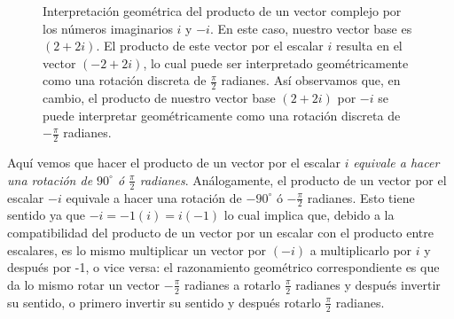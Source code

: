 \documentclass[apuntes]{subfiles}
\begin{document}
\begin{figure}[h!]
    \centering
    \caption{Interpretación geométrica del producto de un vector complejo por los números imaginarios $i$ y $-i$. En este caso, nuestro vector base es $(2+2i)$. El producto de este vector por el escalar $i$ resulta en el vector $(-2+2i)$, lo cual puede ser interpretado geométricamente como una rotación discreta de $\frac{\pi}{2}$ radianes. Así observamos que, en cambio, el producto de nuestro vector base $(2+2i)$ por $-i$ se puede interpretar geométricamente como una rotación discreta de $-\frac{\pi}{2}$ radianes.}
    \label{fig:Producto_de_un_vector_complejo_por_i}
\end{figure}

   Aquí vemos que hacer el producto de un vector por el escalar $i$ \emph{equivale a hacer una rotación de $90^\circ$ ó $\frac{\pi}{2}$ radianes}. Análogamente, el producto de un vector por el escalar $-i$ equivale a hacer una rotación de $-90^\circ$ ó $-\frac{\pi}{2}$ radianes. Esto tiene sentido ya que $-i=-1(i)=i(-1)$ lo cual implica que, debido a la compatibilidad del producto de un vector por un escalar con el producto entre escalares, es lo mismo multiplicar un vector por $(-i)$ a multiplicarlo por $i$ y después por -1, o vice versa: el razonamiento geométrico correspondiente es que da lo mismo rotar un vector $-\frac{\pi}{2}$ radianes a rotarlo $\frac{\pi}{2}$ radianes y después invertir su sentido, o primero invertir su sentido y después rotarlo $\frac{\pi}{2}$ radianes. \\
\end{document}
